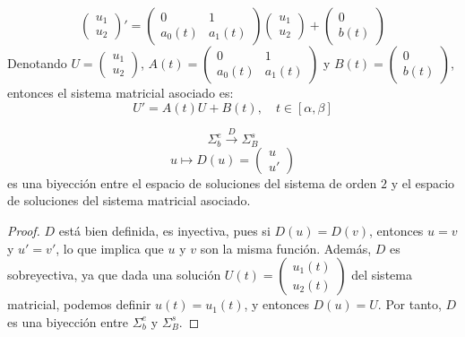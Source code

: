 \[
    \begin{pmatrix}
        u_1 \\
        u_2
    \end{pmatrix}' = \begin{pmatrix}
        0 & 1 \\
        a_0(t) & a_1(t)
    \end{pmatrix} \begin{pmatrix}
        u_1 \\
        u_2
    \end{pmatrix} + \begin{pmatrix}
        0 \\
        b(t)
    \end{pmatrix}
\]
Denotando $U=\begin{pmatrix}
    u_1 \\
    u_2
\end{pmatrix}$, $A(t) = \begin{pmatrix}
    0 & 1 \\
    a_0(t) & a_1(t)
\end{pmatrix}$ y $B(t) = \begin{pmatrix}

    0 \\
    b(t)
\end{pmatrix}$, entonces el sistema matricial asociado es:
\[
    U' = A(t) U + B(t), \quad t \in [\alpha, \beta]
\]

\begin{lema}
    \[
        \Sigma_b^e \xrightarrow{D} \Sigma_B^s
    \]
    \[
        u \mapsto D(u) = \begin{pmatrix}
            u \\
            u'
        \end{pmatrix}
    \]
    es una biyección entre el espacio de soluciones del sistema de orden $2$ y el espacio de soluciones del sistema matricial asociado.
\end{lema}

\begin{proof}
    $D$ está bien definida, es inyectiva, pues si $D(u) = D(v)$, entonces $u = v$ y $u' = v'$, lo que implica que $u$ y $v$ son la misma función. Además, $D$ es sobreyectiva, ya que dada una solución $U(t) = \begin{pmatrix}
        u_1(t) \\
        u_2(t)
    \end{pmatrix}$ del sistema matricial, podemos definir $u(t) = u_1(t)$, y entonces $D(u) = U$. Por tanto, $D$ es una biyección entre $\Sigma_b^e$ y $\Sigma_B^s$.
\end{proof}

